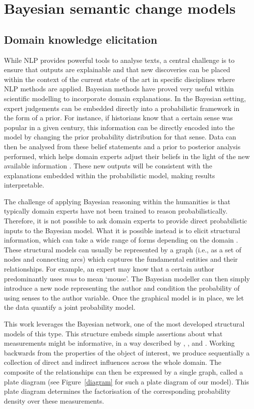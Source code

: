 \documentclass[output=paper%
]{langscibook}
\begin{document}
\section{Bayesian semantic change models}

\subsection{Domain knowledge elicitation}\label{sec:elicitation}
While NLP provides powerful tools to analyse texts, a central challenge is to ensure that outputs are explainable and that new discoveries can be placed within the context of the current state of the art in specific disciplines where NLP methods are applied. Bayesian methods have proved very useful within scientific modelling to incorporate domain explanations. In the Bayesian setting, expert judgements can be embedded directly into a probabilistic framework in the form of a prior. For instance, if historians know that a certain sense was popular in a given century, this information can be directly encoded into the model by changing the prior probability distribution for that sense. Data can then be analysed from these belief statements and a prior to posterior analysis performed, which helps domain experts adjust their beliefs in the light of the new available information \citep[see for example][]{smith2010, hagan2014}. These new outputs will be consistent with the explanations embedded within the probabilistic model, making results interpretable.

The challenge of applying Bayesian reasoning within the humanities is that typically domain experts have not been trained to reason probabilistically. Therefore, it is not possible to ask domain experts to provide direct probabilistic inputs to the Bayesian model. What it is possible instead is to elicit structural information, which can take a wide range of forms depending on the domain \citep{wilk2019}. These structural models can usually be represented by a graph (i.e., as a set of nodes and connecting arcs) which captures the fundamental entities and their relationships. For example, an expert may know that a certain author predominantly uses \emph{mus} to mean `mouse'. The Bayesian modeller can then simply introduce a new node representing the author and condition the probability of using senses to the author variable. Once the graphical model is in place, we let the data quantify a joint probability model. 

This work leverages the Bayesian network, one of the most developed structural models of this type. This structure embeds simple assertions about what measurements might be informative, in a way described by \citet{korb2009}, \citet{smith2010}, and \citet{pearl2014}. Working backwards from the properties of the object of interest, we produce sequentially a collection of direct and indirect influences across the whole domain. The composite of the relationships can then be expressed by a single graph, called a plate diagram (see Figure~\ref{diagram} for such a plate diagram of our model). This plate diagram determines the factorisation of the corresponding probability density over these measurements.
\end{document}
